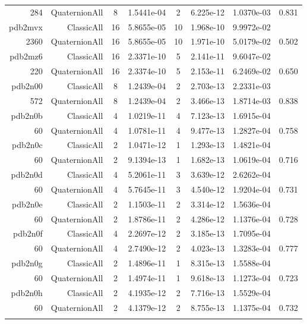 \begin{xltabular}{\textwidth}{r|rcS[table-format=1.4e+2]cS[table-format=1.3e+2]S[table-format=1.4e+2]S[table-format=-1.3]}
284 & QuaternionAll & 8 & 1.5441e-04 & 2 & 6.225e-12 & 1.0370e-03 & 0.831\\  \addlinespace
pdb2mvx & ClassicAll & 16 & 5.8655e-05 & 10 & 1.968e-10 & 9.9972e-02 & \\
2360 & QuaternionAll & 16 & 5.8655e-05 & 10 & 1.971e-10 & 5.0179e-02 & 0.502\\  \addlinespace
pdb2mz6 & ClassicAll & 16 & 2.3371e-10 & 5 & 2.141e-11 & 9.6047e-02 & \\
220 & QuaternionAll & 16 & 2.3374e-10 & 5 & 2.153e-11 & 6.2469e-02 & 0.650\\  \addlinespace
pdb2n00 & ClassicAll & 8 & 1.2439e-04 & 2 & 2.703e-13 & 2.2331e-03 & \\
572 & QuaternionAll & 8 & 1.2439e-04 & 2 & 3.466e-13 & 1.8714e-03 & 0.838\\  \addlinespace
pdb2n0b & ClassicAll & 4 & 1.0219e-11 & 4 & 7.123e-13 & 1.6915e-04 & \\
60 & QuaternionAll & 4 & 1.0781e-11 & 4 & 9.477e-13 & 1.2827e-04 & 0.758\\  \addlinespace
pdb2n0c & ClassicAll & 2 & 1.0471e-12 & 1 & 1.293e-13 & 1.4821e-04 & \\
60 & QuaternionAll & 2 & 9.1394e-13 & 1 & 1.682e-13 & 1.0619e-04 & 0.716\\  \addlinespace
pdb2n0d & ClassicAll & 4 & 5.2061e-11 & 3 & 3.639e-12 & 2.6262e-04 & \\
60 & QuaternionAll & 4 & 5.7645e-11 & 3 & 4.540e-12 & 1.9204e-04 & 0.731\\  \addlinespace
pdb2n0e & ClassicAll & 2 & 1.1503e-11 & 2 & 3.314e-12 & 1.5636e-04 & \\
60 & QuaternionAll & 2 & 1.8786e-11 & 2 & 4.286e-12 & 1.1376e-04 & 0.728\\  \addlinespace
pdb2n0f & ClassicAll & 4 & 2.2697e-12 & 2 & 3.185e-13 & 1.7095e-04 & \\
60 & QuaternionAll & 4 & 2.7490e-12 & 2 & 4.023e-13 & 1.3283e-04 & 0.777\\  \addlinespace
pdb2n0g & ClassicAll & 2 & 1.4896e-11 & 1 & 8.315e-13 & 1.5588e-04 & \\
60 & QuaternionAll & 2 & 1.4974e-11 & 1 & 9.618e-13 & 1.1273e-04 & 0.723\\  \addlinespace
pdb2n0h & ClassicAll & 2 & 4.1935e-12 & 2 & 7.716e-13 & 1.5529e-04 & \\
60 & QuaternionAll & 2 & 4.1379e-12 & 2 & 8.755e-13 & 1.1375e-04 & 0.732\\  \addlinespace

\end{xltabular}
